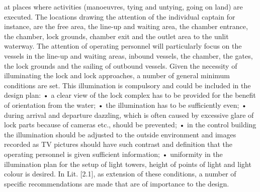 at places where activities (manoeuvres, tying and untying, going on land) are executed.
The locations drawing the attention of the individual captain for instance, are the free area, the line-up
and waiting area, the chamber entrance, the chamber, lock grounds, chamber exit and the outlet area
to the unlit waterway. The attention of operating personnel will particularly focus on the vessels in the
line-up and waiting areas, inbound vessels, the chamber, the gates, the lock grounds and the sailing of
outbound vessels.
Given the necessity of illuminating the lock and lock approaches, a number of general minimum conditions
are set. This illumination is compulsory and could be included in the design plan:
• a clear view of the lock complex has to be provided for the benefit of orientation from the water;
• the illumination has to be sufficiently even;
• during arrival and departure dazzling, which is often caused by excessive glare of lock parts because
of cameras etc., should be prevented;
• in the control building the illumination should be adjusted to the outside environment and images
recorded as TV pictures should have such contrast and definition that the operating personnel is given
sufficient information;
• uniformity in the illumination plan for the setup of light towers, height of points of light and light
colour is desired.
In Lit. [2.1], as extension of these conditions, a number of specific recommendations are made that are
of importance to the design.

